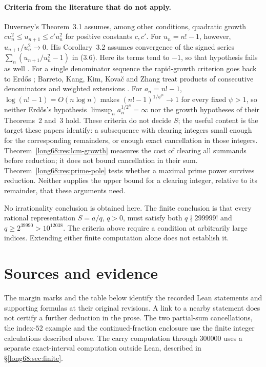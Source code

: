 \documentclass[11pt]{article}
\newcommand{\Ser}{S}
\begin{document}
\paragraph{Criteria from the literature that do not apply.}
Duverney's Theorem~3.1 assumes, among other conditions, quadratic growth
$cu_n^2\le u_{n+1}\le c'u_n^2$ for positive constants $c,c'$. For
$u_n=n!-1$, however, $u_{n+1}/u_n^2\to0$. His Corollary~3.2 assumes
convergence of the signed series $\sum_n(u_{n+1}/u_n^2-1)$ in (3.6).
Here its terms tend to $-1$, so that hypothesis fails as well
\cite[pp.~275, 285--287]{duverney}.  For a single denominator sequence
the rapid-growth criterion goes back to Erd\H{o}s
\cite[Theorem~1, p.~1]{erdos1975}; Barreto, Kang, Kim, Kova\v{c} and Zhang
treat products of consecutive denominators and weighted extensions
\cite[Thms.~2--3 and Rem.~4]{barreto-et-al}.  For $a_n=n!-1$,
$\log(n!-1)=O(n\log n)$ makes $(n!-1)^{1/\psi^n}\to1$ for every fixed
$\psi>1$, so neither Erd\H{o}s's hypothesis
$\limsup_na_n^{1/2^n}=\infty$ nor the growth hypotheses of their Theorems~2
and~3 hold.  These criteria do not decide $\Ser$; the useful content is the
target these papers identify: a subsequence with clearing integers small enough for the corresponding
remainders, or enough exact cancellation in those integers.
Theorem~\ref{long68:res:lcm-growth} measures the cost of clearing all
summands before reduction; it does not bound cancellation in their sum.
Theorem~\ref{long68:res:prime-pole} tests whether a maximal prime power
survives reduction. Neither supplies the upper bound for a clearing
integer, relative to its remainder, that these arguments need.

\medskip
\noindent No irrationality conclusion is obtained here.  The finite
conclusion is that every rational representation $\Ser=a/q$, $q>0$, must
satisfy both $q\nmid299999!$ and $q\ge2^{39990}>10^{12038}$.
The criteria above require a condition at arbitrarily large indices.
Extending either finite computation alone does not establish it.

\section*{Sources and evidence}
\evidenceparagraph{\evidencerecordurl}

The margin marks and the table below identify the recorded Lean
statements and supporting formulas at their original revisions. A link
to a nearby statement does not certify a further deduction in the prose.
The two partial-sum cancellations, the index-$52$ example and the
continued-fraction enclosure use the finite integer calculations
described above. The carry computation through $300000$ uses a separate
exact-interval computation outside Lean, described in
\S\ref{long68:sec:finite}.
\end{document}
